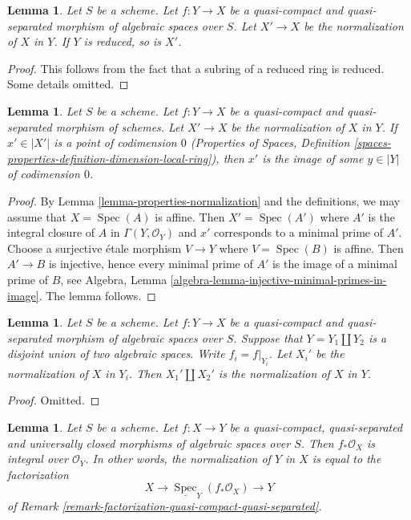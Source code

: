 \documentclass{stacks-project}
\theoremstyle{plain}
\newtheorem{lemma}[subsection]{Lemma}
\theoremstyle{definition}
\theoremstyle{remark}
\numberwithin{equation}{subsection}
\def\Spec{\mathop{\mathrm{Spec}}}
\begin{document}
\begin{lemma}
\label{lemma-normalization-in-reduced}
Let $S$ be a scheme. Let $f : Y \to X$ be a quasi-compact and
quasi-separated morphism of algebraic spaces over $S$.
Let $X' \to X$ be the normalization of $X$ in $Y$.
If $Y$ is reduced, so is $X'$.
\end{lemma}

\begin{proof}
This follows from the fact that a subring of a reduced ring is reduced.
Some details omitted.
\end{proof}

\begin{lemma}
\label{lemma-normalization-generic}
Let $S$ be a scheme. Let $f : Y \to X$ be a quasi-compact and quasi-separated
morphism of schemes. Let $X' \to X$ be the normalization of $X$ in $Y$.
If $x' \in |X'|$ is a point of codimension $0$
(Properties of Spaces, Definition
\ref{spaces-properties-definition-dimension-local-ring}), then
$x'$ is the image of some $y \in |Y|$ of codimension $0$.
\end{lemma}

\begin{proof}
By Lemma \ref{lemma-properties-normalization} and the definitions, we may
assume that $X = \Spec(A)$ is affine. Then $X' = \Spec(A')$ where $A'$ is
the integral closure of $A$ in $\Gamma(Y, \mathcal{O}_Y)$ and $x'$ corresponds
to a minimal prime of $A'$. Choose a surjective \'etale
morphism $V \to Y$ where $V = \Spec(B)$ is affine. Then
$A' \to B$ is injective, hence every minimal prime of $A'$ is
the image of a minimal prime of $B$, see
Algebra, Lemma \ref{algebra-lemma-injective-minimal-primes-in-image}.
The lemma follows.
\end{proof}

\begin{lemma}
\label{lemma-normalization-in-disjoint-union}
Let $S$ be a scheme.
Let $f : Y \to X$ be a quasi-compact and quasi-separated morphism of
algebraic spaces over $S$.
Suppose that $Y = Y_1 \amalg Y_2$ is a disjoint union of two
algebraic spaces.
Write $f_i = f|_{Y_i}$. Let $X_i'$ be the normalization of $X$ in $Y_i$.
Then $X_1' \amalg X_2'$ is the normalization of $X$ in $Y$.
\end{lemma}

\begin{proof}
Omitted.
\end{proof}

\begin{lemma}
\label{lemma-normalization-in-universally-closed}
Let $S$ be a scheme.
Let $f : X \to Y$ be a quasi-compact, quasi-separated and
universally closed morphisms of algebraic spaces over $S$.
Then $f_*\mathcal{O}_X$ is integral over $\mathcal{O}_Y$. In other
words, the normalization of $Y$ in $X$ is equal to the factorization
$$
X \longrightarrow \underline{\Spec}_Y(f_*\mathcal{O}_X)
\longrightarrow Y
$$
of Remark \ref{remark-factorization-quasi-compact-quasi-separated}.
\end{lemma}
\end{document}
